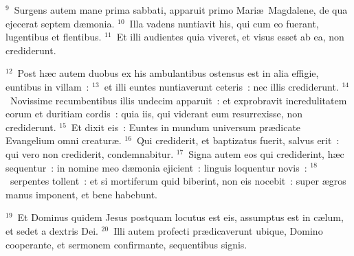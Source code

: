 ${}^{9}$~Surgens autem mane prima sabbati, apparuit primo Mari\ae\ Magdalene, de qua ejecerat septem d\ae monia.
${}^{10}$~Illa vadens nuntiavit his, qui cum eo fuerant, lugentibus et flentibus.
${}^{11}$~Et illi audientes quia viveret, et visus esset ab ea, non crediderunt.


${}^{12}$~Post h\ae c autem duobus ex his ambulantibus ostensus est in alia effigie, euntibus in villam~:
${}^{13}$~et illi euntes nuntiaverunt ceteris~: nec illis crediderunt.
${}^{14}$~Novissime recumbentibus illis undecim apparuit~: et exprobravit incredulitatem eorum et duritiam cordis~: quia iis, qui viderant eum resurrexisse, non crediderunt.
${}^{15}$~Et dixit eis~: Euntes in mundum universum pr\ae dicate Evangelium omni creatur\ae .
${}^{16}$~Qui crediderit, et baptizatus fuerit, salvus erit~: qui vero non crediderit, condemnabitur.
${}^{17}$~Signa autem eos qui crediderint, h\ae c sequentur~: in nomine meo d\ae monia ejicient~: linguis loquentur novis~:
${}^{18}$~serpentes tollent~: et si mortiferum quid biberint, non eis nocebit~: super \ae gros manus imponent, et bene habebunt.


${}^{19}$~Et Dominus quidem Jesus postquam locutus est eis, assumptus est in c\ae lum, et sedet a dextris Dei.
${}^{20}$~Illi autem profecti pr\ae dicaverunt ubique, Domino cooperante, et sermonem confirmante, sequentibus signis.
